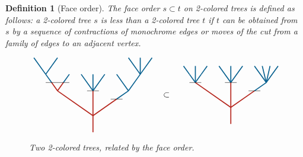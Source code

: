 \documentclass[twoside, 11pt]{amsart}
\newtheorem{definition}{Definition}[section]
\theoremstyle{remark}
\begin{document}
\begin{definition}[Face order]\leavevmode
The \emph{face order} $s\subset t$ on 2-colored trees is defined as follows: a 2-colored tree $s$ is less than a 2-colored tree $t$ if $t$ can be obtained from $s$ by a sequence of contractions of monochrome edges or moves of the cut from a family of edges to an adjacent vertex.

\begin{figure}[h]
\[\vcenter{\hbox{
\begin{tikzpicture}[yscale=0.7,xscale=1]
\draw[very thick, MidnightBlue] (-2.5,3.5)--(-2,2.5);
\draw[very thick, MidnightBlue] (-1.5,3.5)--(-2,2.5);
\draw[very thick, MidnightBlue] (-2,2.5) -- (-1.75,2);
\draw[very thick, MidnightBlue] (-1.25, 2) -- (-1,2.5);
\draw[very thick, MidnightBlue] (-0.5,2.5) -- (0,1.5);
\draw[very thick, MidnightBlue] (0,1.5)--(0,2.5);
\draw[very thick, MidnightBlue] (0,1.5)--(0.5,2.5);
\draw[very thick, MidnightBlue] (1,1)--(1.5,1.5);
\draw[very thick, MidnightBlue] (1.5,1.5)--(1,2.5);
\draw[very thick, MidnightBlue] (1.5,1.5)--(2,2.5);
\draw[very thick, MidnightBlue] (2,2.5)--(1.5,3.5);
\draw[very thick, MidnightBlue] (2,2.5)--(2,3.5);
\draw[very thick, MidnightBlue] (2,2.5)--(2.5,3.5);
\draw[very thick, BrickRed] (0,-1)--(0, 1.5); 
\draw[very thick, BrickRed] (0,0)--(-1.5,1.5);
\draw[very thick, BrickRed] (-1.5,1.5)--(-1.75, 2); 
\draw[very thick, BrickRed] (-1.5,1.5)--(-1.25, 2); 
\draw[very thick, BrickRed] (0,0)--(1, 1);
\draw (-2,2) to (-1,2); 
\draw (-0.25,1.5)-- (0.25, 1.5) ; 
\draw (0.75,1) to (1.25,1);
\end{tikzpicture}}}
\quad \subset \quad
\vcenter{\hbox{
\begin{tikzpicture}[yscale=0.7,xscale=1]
\draw[very thick, MidnightBlue] (-1.5,1.5)--(-1.5,2.5);
\draw[very thick, MidnightBlue] (-2,2.5) -- (-1.75,2);
\draw[very thick, MidnightBlue] (-1.25, 2) -- (-1,2.5);
\draw[very thick, MidnightBlue] (-0.5,2.5) -- (0,1.5);
\draw[very thick, MidnightBlue] (0,1.5)--(0,2.5);
\draw[very thick, MidnightBlue] (0,1.5)--(0.5,2.5);
\draw[very thick, MidnightBlue] (1,1)--(1.5,1.5);
\draw[very thick, MidnightBlue] (1.5,1.5)--(1,2.5);
\draw[very thick, MidnightBlue] (1.5,1.5)--(1.33,2.5);
\draw[very thick, MidnightBlue] (1.5,1.5)--(1.66,2.5);
\draw[very thick, MidnightBlue] (1.5,1.5)--(2,2.5);
\draw[very thick, MidnightBlue] (-1.5,1.5)--(-1.75, 2); 
\draw[very thick, MidnightBlue] (-1.5,1.5)--(-1.25, 2); 
\draw[very thick, BrickRed] (0,-1)--(0, 1.5); 
\draw[very thick, BrickRed] (0,0)--(-1.5,1.5);
\draw[very thick, BrickRed] (0,0)--(1, 1);
\draw (-1.75,1.5) to (-1.25,1.5); 
\draw (-0.25,1.5) to (0.25,1.5); 
\draw (0.75,1) to (1.25,1);
\end{tikzpicture}}}
\]
\caption{Two 2-colored trees, related by the face order.}
\label{Fig2:InclusionOrder}
\end{figure}

\end{definition}
\end{document}
